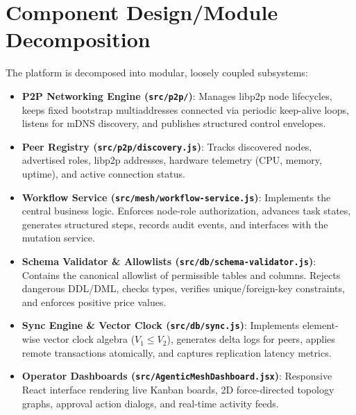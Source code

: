 \documentclass[12pt,a4paper]{report}
\begin{document}
\section{Component Design/Module Decomposition}
The platform is decomposed into modular, loosely coupled subsystems:
\begin{itemize}[leftmargin=*,itemsep=3pt]
    \item \textbf{P2P Networking Engine (\texttt{src/p2p/})}: Manages libp2p node lifecycles, keeps fixed bootstrap multiaddresses connected via periodic keep-alive loops, listens for mDNS discovery, and publishes structured control envelopes.
    \item \textbf{Peer Registry (\texttt{src/p2p/discovery.js})}: Tracks discovered nodes, advertised roles, libp2p addresses, hardware telemetry (CPU, memory, uptime), and active connection status.
    \item \textbf{Workflow Service (\texttt{src/mesh/workflow-service.js})}: Implements the central business logic. Enforces node-role authorization, advances task states, generates structured steps, records audit events, and interfaces with the mutation service.
    \item \textbf{Schema Validator \& Allowlists (\texttt{src/db/schema-validator.js})}: Contains the canonical allowlist of permissible tables and columns. Rejects dangerous DDL/DML, checks types, verifies unique/foreign-key constraints, and enforces positive price values.
    \item \textbf{Sync Engine \& Vector Clock (\texttt{src/db/sync.js})}: Implements element-wise vector clock algebra ($V_1 \le V_2$), generates delta logs for peers, applies remote transactions atomically, and captures replication latency metrics.
    \item \textbf{Operator Dashboards (\texttt{src/AgenticMeshDashboard.jsx})}: Responsive React interface rendering live Kanban boards, 2D force-directed topology graphs, approval action dialogs, and real-time activity feeds.
\end{itemize}
\end{document}
